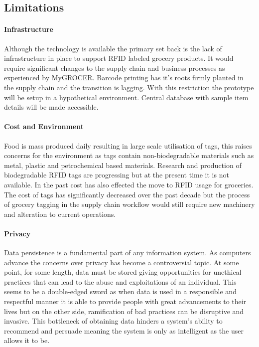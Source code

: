 \documentclass[a4paper, 11pt]{article}
\begin{document}
\vspace{\baselineskip}
\vspace{\baselineskip}
\vspace{\baselineskip}

\subsection{Limitations}

\paragraph{Infrastructure}Although the technology is available the primary set back is the lack of infrastructure in place to support RFID labeled grocery products. It would require significant changes to the supply chain and business processes \cite{pervasiveComp} as experienced by MyGROCER. Barcode printing has it's roots firmly planted in the supply chain and the transition is lagging. With this restriction the prototype will be setup in a hypothetical environment. Central database with sample item details will be made accessible. 

\paragraph{Cost and Environment}Food is mass produced daily resulting in large scale utilisation of tags, this raises concerns for the environment as tags contain non-biodegradable materials such as metal, plastic and petrochemical based materials.\cite{bioTags} Research and production of biodegradable RFID tags are progressing but at the present time it is not available. In the past cost has also effected the move to RFID usage for groceries. The cost of tags has significantly decreased over the past decade but the process of grocery tagging in the supply chain workflow would still require new machinery and alteration to current operations. 

\paragraph{Privacy}Data persistence is a fundamental part of any information system. As computers advance the concerns over privacy has become a controversial topic. At some point, for some length, data must be stored giving opportunities for unethical practices that can lead to the abuse and exploitations of an individual. This seems to be a double-edged sword as when data is used in a responsible and respectful manner it is able to provide people with great advancements to their lives but on the other side, ramification of bad practices can be disruptive and invasive. This bottleneck of obtaining data hinders a system's ability to recommend and persuade meaning the system is only as intelligent as the user allows it to be.
\clearpage
\end{document}
